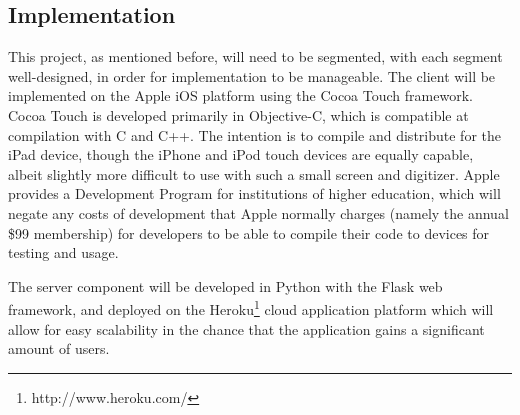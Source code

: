 \documentclass{acm_proc_article-sp}
\begin{document}
\subsection{Implementation}
This project, as mentioned before, will need to be segmented, with each segment well-designed, in order for implementation to be manageable. The client will be implemented on the Apple iOS platform using the Cocoa Touch framework. Cocoa Touch is developed primarily in Objective-C, which is compatible at compilation with C and C++. The intention is to compile and distribute for the iPad device, though the iPhone and iPod touch devices are equally capable, albeit slightly more difficult to use with such a small screen and digitizer. Apple provides a Development Program for institutions of higher education, which will negate any costs of development that Apple normally charges (namely the annual \$99 membership) for developers to be able to compile their code to devices for testing and usage.

The server component will be developed in Python with the Flask web framework, and deployed on the Heroku\footnote{http://www.heroku.com/} cloud application platform which will allow for easy scalability  in the chance that the application gains a significant amount of users.



  
%
%


\balancecolumns

\end{document}
